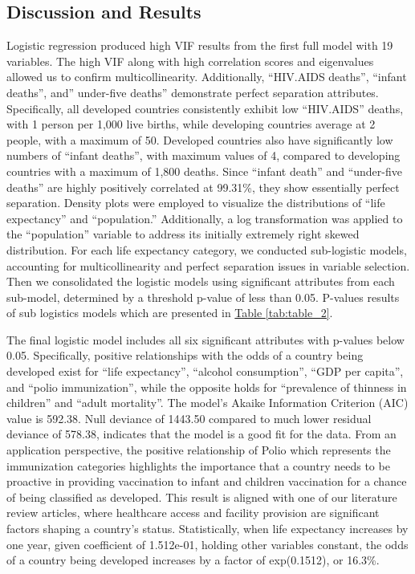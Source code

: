 \documentclass[12pt]{article}
\begin{document}
\begin{multicols}{2}
\section{Discussion and Results}
Logistic regression produced high VIF results from the first full model with 19 variables. The high VIF along with high correlation scores and eigenvalues allowed us to confirm multicollinearity. Additionally, “HIV.AIDS deaths”, “infant deaths”, and” under-five deaths” demonstrate perfect separation attributes. Specifically, all developed countries consistently exhibit low “HIV.AIDS” deaths, with 1 person per 1,000 live births, while developing countries average at 2 people, with a maximum of 50. Developed countries also have significantly low numbers of “infant deaths”, with maximum values of 4, compared to developing countries with a maximum of 1,800 deaths. Since “infant death” and “under-five deaths” are highly positively correlated at 99.31\%, they show essentially perfect separation. Density plots were employed to visualize the distributions of “life expectancy” and “population.” Additionally, a log transformation was applied to the “population” variable to address its initially extremely right skewed distribution. For each life expectancy category, we conducted sub-logistic models, accounting for multicollinearity and perfect separation issues in variable selection. Then we consolidated the logistic models using significant attributes from each sub-model, determined by a threshold p-value of less than 0.05. P-values results of sub logistics models which are presented in \hyperref[tab:table_2]{Table \ref{tab:table_2}}. 

The final logistic model includes all six significant attributes with p-values below 0.05. Specifically, positive relationships with the odds of a country being developed exist for “life expectancy”, “alcohol consumption”, “GDP per capita”, and “polio immunization”, while the opposite holds for “prevalence of thinness in children” and “adult mortality”. The model's Akaike Information Criterion (AIC) value is 592.38. Null deviance of 1443.50 compared to much lower residual deviance of 578.38, indicates that the model is a good fit for the data. From an application perspective, the positive relationship of Polio which represents the immunization categories highlights the importance that a country needs to be proactive in providing vaccination to infant and children vaccination for a chance of being classified as developed. This result is aligned with one of our literature review articles, where healthcare access and facility provision are significant factors shaping a country's status. Statistically, when life expectancy increases by one year, given coefficient of 1.512e-01, holding other variables constant, the odds of a country being developed increases by a factor of exp(0.1512), or 16.3\%. 


\end{multicols}
\end{document}
